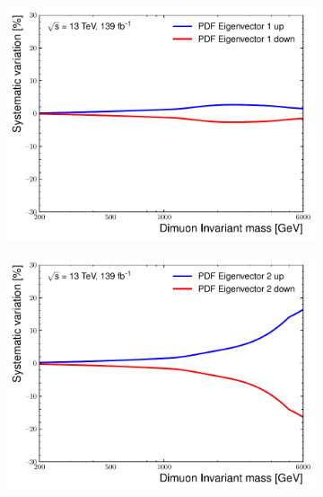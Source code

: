 \begin{figure}[h!]
    \centering
    \begin{subfigure}[b]{0.42\textwidth}
        \centering
        \includegraphics[width=\textwidth]{figures/analysis/datamc/Uncertainties/theory/mm/backgroundTemplate_KF_PDF_EV1.pdf}
        \label{fig:uncert:mmpdfvar1}
    \end{subfigure}
    \begin{subfigure}[b]{0.42\textwidth}
        \centering
        \includegraphics[width=\textwidth]{figures/analysis/datamc/Uncertainties/theory/mm/backgroundTemplate_KF_PDF_EV2.pdf}
        \label{fig:uncert:mmpdfvar2}
    \end{subfigure}
    \begin{subfigure}[b]{0.42\textwidth}

\end{subfigure}
\end{figure}
